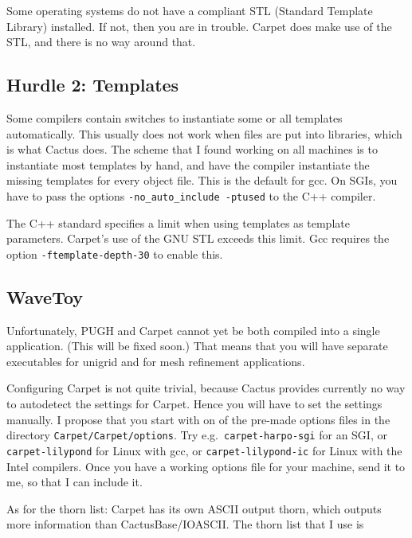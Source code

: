 Some operating systems do not have a compliant STL (Standard Template
Library) installed.  If not, then you are in trouble.  Carpet does
make use of the STL, and there is no way around that.

\subsection{Hurdle 2: Templates}

Some compilers contain switches to instantiate some or all templates
automatically.  This usually does not work when files are put into
libraries, which is what Cactus does.  The scheme that I found working
on all machines is to instantiate most templates by hand, and have the
compiler instantiate the missing templates for every object file.
This is the default for gcc.  On SGIs, you have to pass the options
\texttt{-no\_auto\_include -ptused} to the C++ compiler.

The C++ standard specifies a limit when using templates as template
parameters.  Carpet's use of the GNU STL exceeds this limit.  Gcc
requires the option \texttt{-ftemplate-depth-30} to enable this.

\subsection{WaveToy}

Unfortunately, PUGH and Carpet cannot yet be both compiled into a
single application.  (This will be fixed soon.)  That means that you
will have separate executables for unigrid and for mesh refinement
applications.

Configuring Carpet is not quite trivial, because Cactus provides
currently no way to autodetect the settings for Carpet.  Hence you
will have to set the settings manually.  I propose that you start with
on of the pre-made options files in the directory
\texttt{Carpet/Carpet/options}.  Try e.g.\ \texttt{carpet-harpo-sgi}
for an SGI, or \texttt{carpet-lilypond} for Linux with gcc, or
\texttt{carpet-lilypond-ic} for Linux with the Intel compilers.  Once
you have a working options file for your machine, send it to me, so
that I can include it.

As for the thorn list: Carpet has its own ASCII output thorn, which
outputs more information than CactusBase/IOASCII.  The thorn list that
I use is

